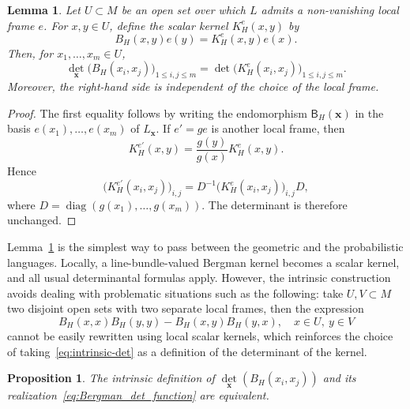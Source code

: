 \documentclass[12pt,a4paper,reqno]{article}
\theoremstyle{thmstyleone}
\newtheorem{lemma}[theorem]{Lemma}
\newtheorem{proposition}[theorem]{Proposition}
\theoremstyle{thmstylethree}
\theoremstyle{thmstyletwo}
\numberwithin{equation}{subsection}
\def\leq{\leqslant}
\begin{document}
\begin{lemma}\label{lem:local-expression-intrinsic-det}
Let $U\subset M$ be an open set over which $L$ admits a non-vanishing local frame $e$. For $x,y\in U$, define the scalar kernel $K_H^e(x,y)$ by
\[
    B_H(x,y)e(y)=K_H^e(x,y)e(x).
\]
Then, for $x_1,\ldots,x_m\in U$,
\[
    \det_{\mathbf x}\big(B_H(x_i,x_j)\big)_{1\leq i,j\leq m}
    =
    \det\big(K_H^e(x_i,x_j)\big)_{1\leq i,j\leq m}.
\]
Moreover, the right-hand side is independent of the choice of the local frame.
\end{lemma}

\begin{proof}
The first equality follows by writing the endomorphism $\mathsf B_H(\mathbf x)$ in the basis $e(x_1),\ldots,e(x_m)$ of $L_{\mathbf x}$. If $e'=ge$ is another local frame, then
\[
    K_H^{e'}(x,y)
    =
    \frac{g(y)}{g(x)}K_H^e(x,y).
\]
Hence
\[
    \big(K_H^{e'}(x_i,x_j)\big)_{i,j}
    =
    D^{-1}\big(K_H^e(x_i,x_j)\big)_{i,j}D,
\]
where $D=\operatorname{diag}(g(x_1),\ldots,g(x_m))$. The determinant is therefore unchanged.
\end{proof}

Lemma~\ref{lem:local-expression-intrinsic-det} is the simplest way to pass between the geometric and the probabilistic languages. Locally, a line-bundle-valued Bergman kernel becomes a scalar kernel, and all usual determinantal formulas apply. However, the intrinsic construction avoids dealing with problematic situations such as the following: take $U,V\subset M$ two disjoint open sets with two separate local frames, then the expression
\[
B_H(x,x)B_H(y,y)-B_H(x,y)B_H(y,x),\quad x\in U,\ y\in V
\]
cannot be easily rewritten using local scalar kernels, which reinforces the choice of taking~\eqref{eq:intrinsic-det} as a definition of the determinant of the kernel.


\begin{proposition}
The intrinsic definition of $\det\limits_{\mathbf x}(B_H(x_i,x_j))$ and its realization~\eqref{eq:Bergman_det_function} are equivalent.
\end{proposition}
\end{document}
